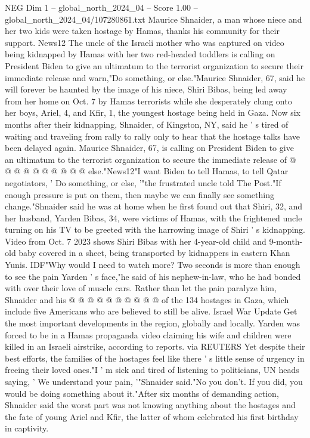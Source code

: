 \begin{textsample}{NEG Dim 1 – global\_north\_2024\_04 – Score 1.00 – global\_north\_2024\_04/107280861.txt}  \label{ex:f1_neg_250}
Maurice Shnaider, a man whose niece and her two kids were taken hostage by Hamas, thanks his community for their support.
News12 The uncle of the Israeli mother who was captured on video being kidnapped by Hamas with her two red-headed toddlers is calling on President Biden to give an ultimatum to the terrorist organization to secure their immediate release and warn,"Do something, or else."Maurice Shnaider, 67, said he will forever be haunted by the image of his niece, Shiri Bibas, being led away from her home on Oct. 7 by Hamas terrorists while she desperately clung onto her boys, Ariel, 4, and Kfir, 1, the youngest hostage being held in Gaza.
Now six months after their kidnapping, Shnaider, of Kingston, NY, said he ' s tired of waiting and traveling from rally to rally only to hear that the hostage talks have been delayed again.
Maurice Shnaider, 67, is calling on President Biden to give an ultimatum to the terrorist organization to secure the immediate release of @ @ @ @ @ @ @ @ @ @ else."News12"I want Biden to tell Hamas, to tell Qatar negotiators, ' Do something, or else, '"the frustrated uncle told The Post."If enough pressure is put on them, then maybe we can finally see something change."Shnaider said he was at home when he first found out that Shiri, 32, and her husband, Yarden Bibas, 34, were victims of Hamas, with the frightened uncle turning on his TV to be greeted with the harrowing image of Shiri ' s kidnapping.
Video from Oct. 7 2023 shows Shiri Bibas with her 4-year-old child and 9-month-old baby covered in a sheet, being transported by kidnappers in eastern Khan Yunis.
IDF"Why would I need to watch more?
Two seconds is more than enough to see the pain Yarden ' s face,"he said of his nephew-in-law, who he had bonded with over their love of muscle cars.
Rather than let the pain paralyze him, Shnaider and his @ @ @ @ @ @ @ @ @ @ of the 134 hostages in Gaza, which include five Americans who are believed to still be alive.
Israel War Update Get the most important developments in the region, globally and locally.
Yarden was forced to be in a Hamas propaganda video claiming his wife and children were killed in an Israeli airstrike, according to reports. via REUTERS Yet despite their best efforts, the families of the hostages feel like there ' s little sense of urgency in freeing their loved ones."I ' m sick and tired of listening to politicians, UN heads saying, ' We understand your pain, '"Shnaider said."No you don't.
If you did, you would be doing something about it."After six months of demanding action, Shnaider said the worst part was not knowing anything about the hostages and the fate of young Ariel and Kfir, the latter of whom celebrated his first birthday in captivity.

\end{textsample}
